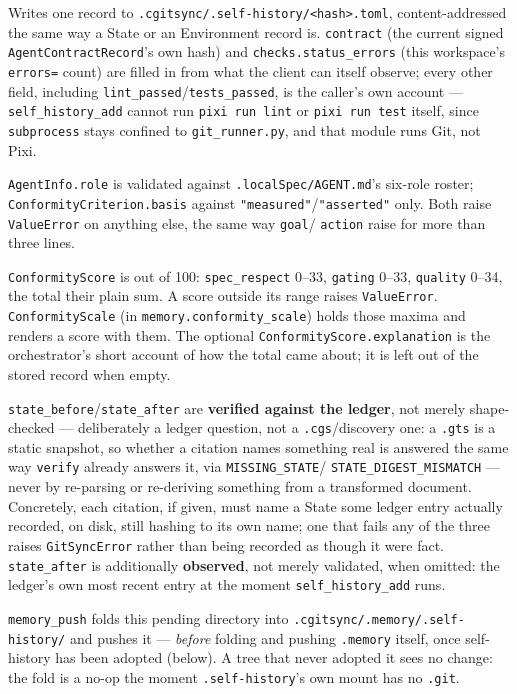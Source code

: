 Writes one record to \texttt{.cgitsync/.self-history/<hash>.toml}, content-addressed
the same way a State or an Environment record is. \texttt{contract} (the
current signed \texttt{AgentContractRecord}'s own hash) and
\texttt{checks.status\_errors} (this workspace's \texttt{errors=} count) are
filled in from what the client can itself observe; every other field,
including \texttt{lint\_passed}/\texttt{tests\_passed}, is the caller's own
account --- \texttt{self\_history\_add} cannot run \texttt{pixi run lint} or
\texttt{pixi run test} itself, since \texttt{subprocess} stays confined to
\texttt{git\_runner.py}, and that module runs Git, not Pixi.

\texttt{AgentInfo.role} is validated against \texttt{.localSpec/AGENT.md}'s
six-role roster; \texttt{ConformityCriterion.basis} against
\texttt{"measured"}/\texttt{"asserted"} only. Both raise
\texttt{ValueError} on anything else, the same way \texttt{goal}/
\texttt{action} raise for more than three lines.

\texttt{ConformityScore} is out of 100: \texttt{spec\_respect} 0--33,
\texttt{gating} 0--33, \texttt{quality} 0--34, the total their plain sum.
A score outside its range raises \texttt{ValueError}.
\texttt{ConformityScale} (in \texttt{memory.conformity\_scale}) holds those
maxima and renders a score with them. The optional
\texttt{ConformityScore.explanation} is the orchestrator's short account of
how the total came about; it is left out of the stored record when empty.

\texttt{state\_before}/\texttt{state\_after} are \textbf{verified against
the ledger}, not merely shape-checked --- deliberately a ledger question,
not a \texttt{.cgs}/discovery one: a \texttt{.gts} is a static snapshot, so
whether a citation names something real is answered the same way
\texttt{verify} already answers it, via \texttt{MISSING\_STATE}/
\texttt{STATE\_DIGEST\_MISMATCH} — never by re-parsing or re-deriving
something from a transformed document. Concretely, each citation, if
given, must name a State some ledger entry actually recorded, on disk,
still hashing to its own name; one that fails any of the three raises
\texttt{GitSyncError} rather than being recorded as though it were fact.
\texttt{state\_after} is additionally \textbf{observed}, not merely
validated, when omitted: the ledger's own most recent entry at the moment
\texttt{self\_history\_add} runs.

\texttt{memory\_push} folds this pending directory into
\texttt{.cgitsync/.memory/.self-history/} and pushes it --- \emph{before}
folding and pushing \texttt{.memory} itself, once self-history has been
adopted (below). A tree that never adopted it sees no change: the fold is
a no-op the moment \texttt{.self-history}'s own mount has no \texttt{.git}.

